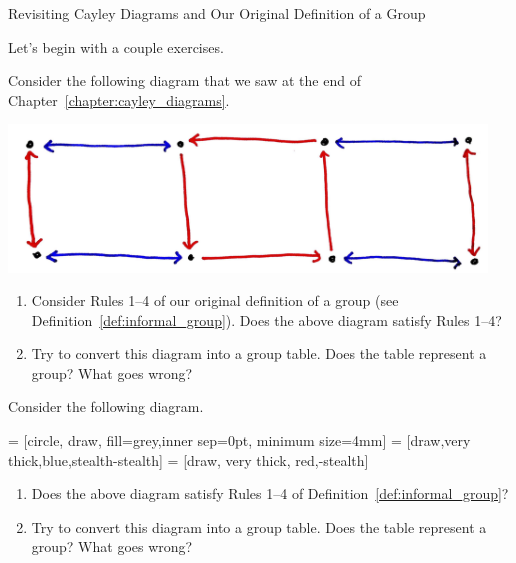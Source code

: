\begin{section}{Revisiting Cayley Diagrams and Our Original Definition of a Group}%

Let's begin with a couple exercises.

\begin{exercise}\label{exer:nonregular1}%
Consider the following diagram that we saw at the end of Chapter~\ref{chapter:cayley_diagrams}.
\begin{center}
\includegraphics[width=5in]{nonregular.png}
\end{center}
\begin{enumerate}
\item[(a)] Consider Rules 1--4 of our original definition of a group (see Definition~\ref{def:informal_group}).  Does the above diagram satisfy Rules 1--4?
\item[(b)] Try to convert this diagram into a group table.  Does the table represent a group? What goes wrong?
\end{enumerate}
\end{exercise}

\begin{exercise}\label{exer:nonregular2}%
Consider the following diagram.

 = [circle, draw, fill=grey,inner sep=0pt, minimum size=4mm]
 = [draw,very thick,blue,stealth-stealth]
 = [draw, very thick, red,-stealth]

\begin{center}
\end{center}
\begin{enumerate}
\item[(a)] Does the above diagram satisfy Rules 1--4 of Definition~\ref{def:informal_group}?
\item[(b)] Try to convert this diagram into a group table.  Does the table represent a group? What goes wrong?
\end{enumerate}
\end{exercise}


\end{section}
